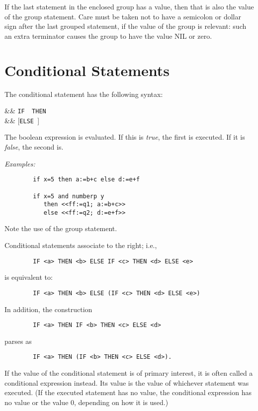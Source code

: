 If the last statement in the enclosed group has a value, then that is also
the value of the group statement.  Care must be taken not to have a
semicolon or dollar sign after the last grouped statement, if the value of
the group is relevant: such an extra terminator causes the group to have
the value NIL or zero.

\section{Conditional Statements}
\hypertarget{command:IF}{}
\hypertarget{reserved:THEN}{}
\hypertarget{reserved:ELSE}{}

The conditional statement
has the following syntax:
\begin{syntaxtable}
  &\BNFprod &
    \texttt{IF }\texttt{ THEN } \\
      && [\texttt{ELSE }]
\end{syntaxtable}
The boolean expression is evaluated. If this is \emph{true}, the first
 is executed.  If it is \emph{false}, the second is.

\textit{Examples:}
\begin{verbatim}
        if x=5 then a:=b+c else d:=e+f

        if x=5 and numberp y
           then <<ff:=q1; a:=b+c>>
           else <<ff:=q2; d:=e+f>>
\end{verbatim}
Note the use of the group statement.

Conditional statements associate to the right; i.e.,
\begin{verbatim}
        IF <a> THEN <b> ELSE IF <c> THEN <d> ELSE <e>
\end{verbatim}
is equivalent to:
\begin{verbatim}
        IF <a> THEN <b> ELSE (IF <c> THEN <d> ELSE <e>)
\end{verbatim}
In addition, the construction
\begin{verbatim}
        IF <a> THEN IF <b> THEN <c> ELSE <d>
\end{verbatim}
parses as
\begin{verbatim}
        IF <a> THEN (IF <b> THEN <c> ELSE <d>).
\end{verbatim}
If the value of the conditional statement is of primary interest, it is often called a conditional
expression instead.  Its value is the value of whichever statement was
executed. (If the executed statement has no value, the conditional
expression has no value or the value 0, depending on how it is used.)

